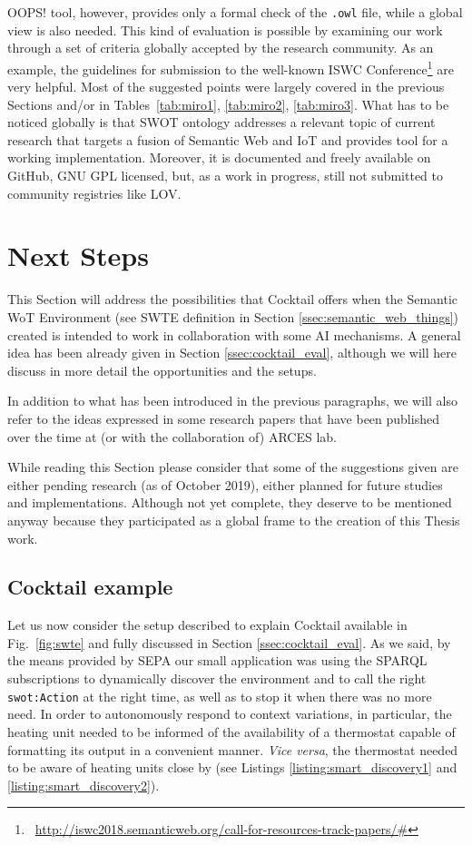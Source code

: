 OOPS! tool, however, provides only a formal check of the \texttt{.owl} file, while a global view is also needed. This kind of evaluation is possible by examining our work through a set of criteria globally accepted by the research community. As an example, the guidelines for submission to the well-known ISWC Conference\footnote{\faLink~\url{http://iswc2018.semanticweb.org/call-for-resources-track-papers/\#}} are very helpful. Most of the suggested points were largely covered in the previous Sections and/or in Tables~\ref{tab:miro1}, \ref{tab:miro2}, \ref{tab:miro3}. What has to be noticed globally is that SWOT ontology addresses a relevant topic of current research that targets a fusion of Semantic Web and IoT and provides tool for a working implementation. Moreover, it is documented and freely available on GitHub, GNU GPL licensed, but, as a work in progress, still not submitted to community registries like LOV.

\section{Next Steps}
\label{ssec:app_examples}
This Section will address the possibilities that Cocktail offers when the Semantic WoT Environment (see SWTE definition in Section \ref{ssec:semantic_web_things}) created is intended to work in collaboration with some AI mechanisms. A general idea has been already given in Section \ref{ssec:cocktail_eval}, although we will here discuss in more detail the opportunities and the setups. 

In addition to what has been introduced in the previous paragraphs, we will also refer to the ideas expressed in some research papers that have been published \cite{antoniazzi2017web, paolini2019fall, paolini2019anchorless} over the time at (or with the collaboration of) ARCES lab. 

While reading this Section please consider that some of the suggestions given are either pending research (as of October 2019), either planned for future studies and implementations. Although not yet complete, they deserve to be mentioned anyway because they participated as a global frame to the creation of this Thesis work.

\subsection{Cocktail example}
Let us now consider the setup described to explain Cocktail available in Fig.~\ref{fig:swte} and fully discussed in Section \ref{ssec:cocktail_eval}. As we said, by the means provided by SEPA our small application was using the SPARQL subscriptions to dynamically discover the environment and to call the right \texttt{swot:Action} at the right time, as well as to stop it when there was no more need. In order to autonomously respond to context variations, in particular, the heating unit needed to be informed of the availability of a thermostat capable of formatting its output in a convenient manner. \textit{Vice versa}, the thermostat needed to be aware of heating units close by (see Listings \ref{listing:smart_discovery1} and \ref{listing:smart_discovery2}).


